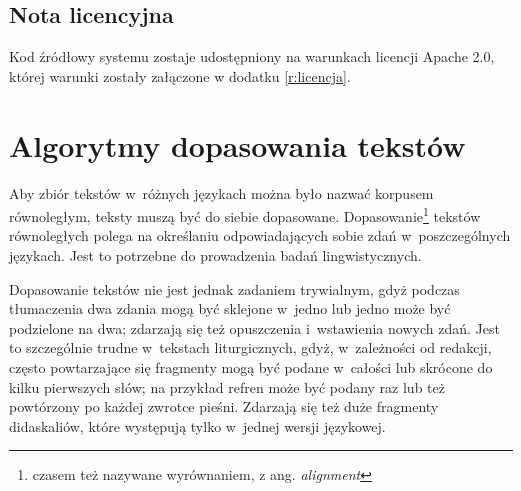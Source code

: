 \documentclass{pracamgr}
\begin{document}
\section*{Nota licencyjna}

Kod źródłowy systemu zostaje udostępniony na warunkach licencji Apache
2.0, której warunki zostały załączone w dodatku \ref{r:licencja}.

%
%




\chapter{Algorytmy dopasowania tekstów}\label{r:algo}

Aby zbiór tekstów w~różnych językach można było nazwać korpusem
równoległym, teksty muszą być do siebie
dopasowane. Dopasowanie\footnote{czasem też nazywane wyrównaniem,
  z ang. \textit{alignment}} tekstów równoległych polega na określaniu
odpowiadających sobie zdań w~poszczególnych językach. Jest to
potrzebne do prowadzenia badań lingwistycznych.

Dopasowanie tekstów nie jest jednak zadaniem trywialnym, gdyż podczas
tłumaczenia dwa zdania mogą być sklejone w~jedno lub jedno może być
podzielone na dwa; zdarzają się też opuszczenia i~wstawienia nowych
zdań. Jest to szczególnie trudne w~tekstach liturgicznych, gdyż,
w~zależności od redakcji, często powtarzające się fragmenty mogą być
podane w~całości lub skrócone do kilku pierwszych słów; na przykład
refren może być podany raz lub też powtórzony po każdej zwrotce
pieśni. Zdarzają się też duże fragmenty didaskaliów, które występują
tylko w~jednej wersji językowej.
\end{document}
